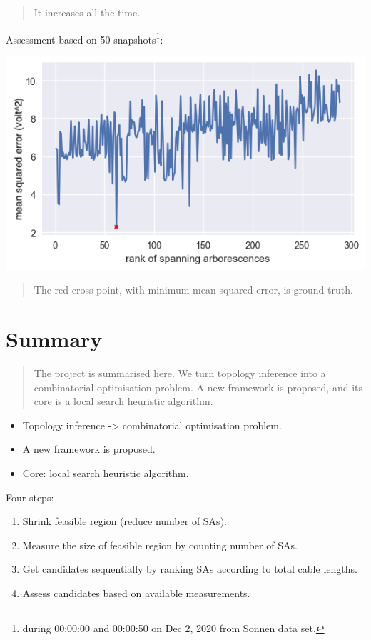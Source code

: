 \documentclass[
]{book}
\providecommand{\tightlist}{%
  \setlength{\itemsep}{0pt}\setlength{\parskip}{0pt}}
\begin{document}
\begin{quote}
It increases all the time.
\end{quote}

Assessment based on 50 snapshots\footnote{during 00:00:00 and 00:00:50 on Dec 2, 2020
  from Sonnen data set.}:

\begin{center}\includegraphics{Pictures/errors_288} \end{center}

\begin{quote}
The red cross point, with minimum mean squared error, is ground truth.
\end{quote}

\hypertarget{summary}{%
\section{Summary}\label{summary}}

\begin{quote}
The project is summarised here. We turn topology inference into a
combinatorial optimisation problem. A new framework is proposed, and its core
is a local search heuristic algorithm.
\end{quote}

\begin{itemize}
\tightlist
\item
  Topology inference -\textgreater{} combinatorial optimisation problem.
\item
  A new framework is proposed.
\item
  Core: local search heuristic algorithm.
\end{itemize}

Four steps:

\begin{enumerate}
\def\labelenumi{\arabic{enumi}.}
\tightlist
\item
  Shrink feasible region (reduce number of SAs).
\item
  Measure the size of feasible region by counting number of SAs.
\item
  Get candidates sequentially by ranking SAs according to total cable lengths.
\item
  Assess candidates based on available measurements.
\end{enumerate}
\end{document}
